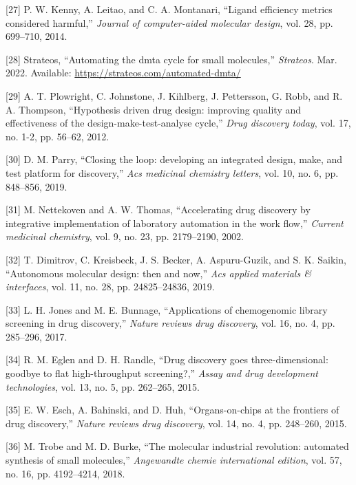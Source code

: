 \documentclass[11pt]{article}
\begin{document}
\hypertarget{citeproc_bib_item_27}{[27] P. W. Kenny, A. Leitao, and C. A. Montanari, “Ligand efficiency metrics considered harmful,” \textit{Journal of computer-aided molecular design}, vol. 28, pp. 699–710, 2014.}

\hypertarget{citeproc_bib_item_28}{[28] Strateos, “Automating the dmta cycle for small molecules,” \textit{Strateos}. Mar. 2022. Available: \url{https://strateos.com/automated-dmta/}}

\hypertarget{citeproc_bib_item_29}{[29] A. T. Plowright, C. Johnstone, J. Kihlberg, J. Pettersson, G. Robb, and R. A. Thompson, “Hypothesis driven drug design: improving quality and effectiveness of the design-make-test-analyse cycle,” \textit{Drug discovery today}, vol. 17, no. 1-2, pp. 56–62, 2012.}

\hypertarget{citeproc_bib_item_30}{[30] D. M. Parry, “Closing the loop: developing an integrated design, make, and test platform for discovery,” \textit{Acs medicinal chemistry letters}, vol. 10, no. 6, pp. 848–856, 2019.}

\hypertarget{citeproc_bib_item_31}{[31] M. Nettekoven and A. W. Thomas, “Accelerating drug discovery by integrative implementation of laboratory automation in the work flow,” \textit{Current medicinal chemistry}, vol. 9, no. 23, pp. 2179–2190, 2002.}

\hypertarget{citeproc_bib_item_32}{[32] T. Dimitrov, C. Kreisbeck, J. S. Becker, A. Aspuru-Guzik, and S. K. Saikin, “Autonomous molecular design: then and now,” \textit{Acs applied materials \& interfaces}, vol. 11, no. 28, pp. 24825–24836, 2019.}

\hypertarget{citeproc_bib_item_33}{[33] L. H. Jones and M. E. Bunnage, “Applications of chemogenomic library screening in drug discovery,” \textit{Nature reviews drug discovery}, vol. 16, no. 4, pp. 285–296, 2017.}

\hypertarget{citeproc_bib_item_34}{[34] R. M. Eglen and D. H. Randle, “Drug discovery goes three-dimensional: goodbye to flat high-throughput screening?,” \textit{Assay and drug development technologies}, vol. 13, no. 5, pp. 262–265, 2015.}

\hypertarget{citeproc_bib_item_35}{[35] E. W. Esch, A. Bahinski, and D. Huh, “Organs-on-chips at the frontiers of drug discovery,” \textit{Nature reviews drug discovery}, vol. 14, no. 4, pp. 248–260, 2015.}

\hypertarget{citeproc_bib_item_36}{[36] M. Trobe and M. D. Burke, “The molecular industrial revolution: automated synthesis of small molecules,” \textit{Angewandte chemie international edition}, vol. 57, no. 16, pp. 4192–4214, 2018.}
\end{document}
